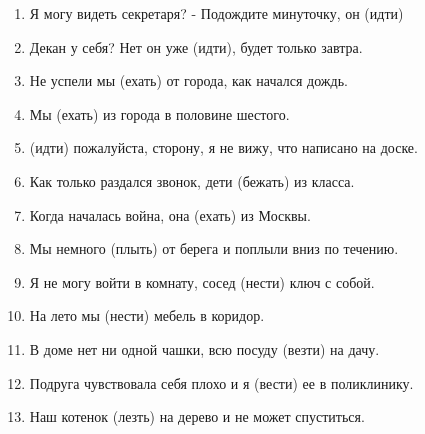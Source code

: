 \documentclass[paper=a4, fontsize=11pt]{scrartcl}
\begin{document}
\begin{enumerate}
    \item Я могу видеть секретаря? - Подождите минуточку, он	\raisebox{-0.1cm}{\shortstack{\underline{\hspace{3cm}}}}	(идти) 
    \item Декан у себя?  Нет он уже  \raisebox{-0.1cm}{\shortstack{\underline{\hspace{3cm}}}}(идти), будет только завтра.
    \item Не успели мы \raisebox{-0.1cm}{\shortstack{\underline{\hspace{3cm}}}}(ехать) от города, как начался дождь.
    \item Мы        \raisebox{-0.1cm}{\shortstack{\underline{\hspace{3cm}}}}(ехать) из города в половине шестого.
    \item  \raisebox{-0.1cm}{\shortstack{\underline{\hspace{3cm}}}}(идти) пожалуйста, сторону, я не вижу, что написано на доске.
    \item Как только раздался звонок, дети \raisebox{-0.1cm}{\shortstack{\underline{\hspace{3cm}}}}(бежать) из класса.
    \item Когда началась война, она \raisebox{-0.1cm}{\shortstack{\underline{\hspace{3cm}}}}(ехать) из Москвы.
    \item Мы немного \raisebox{-0.1cm}{\shortstack{\underline{\hspace{3cm}}}}(плыть) от берега и поплыли вниз по течению.
    \item Я не могу войти в комнату, сосед \raisebox{-0.1cm}{\shortstack{\underline{\hspace{3cm}}}}(нести) ключ с собой.
    \item На лето мы \raisebox{-0.1cm}{\shortstack{\underline{\hspace{3cm}}}}(нести) мебель в коридор.
    \item В доме нет ни одной чашки, всю посуду  \raisebox{-0.1cm}{\shortstack{\underline{\hspace{3cm}}}}(везти) на дачу.
    \item  Подруга чувствовала себя плохо и я  \raisebox{-0.1cm}{\shortstack{\underline{\hspace{3cm}}}}(вести) ее в поликлинику.
    \item Наш котенок \raisebox{-0.1cm}{\shortstack{\underline{\hspace{3cm}}}}(лезть) на дерево и не может спуститься.

\end{enumerate}
\end{document}
